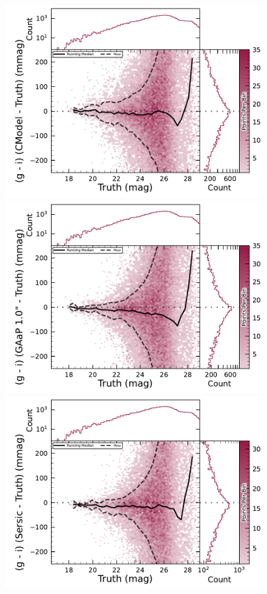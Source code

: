 \begin{figure}[htb]
\centering
\includegraphics[width=0.98\linewidth]{figures/injected_lsst_cells_v1_5063_r_color_cmodel_g_minus_i.pdf}
\includegraphics[width=0.98\linewidth]{figures/injected_lsst_cells_v1_5063_r_color_gaap_g_minus_i.pdf}
\includegraphics[width=0.98\linewidth]{figures/injected_lsst_cells_v1_5063_r_color_sersic_g_minus_i.pdf}

\end{figure}

